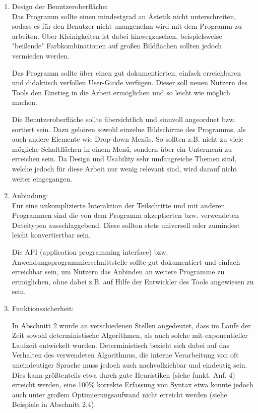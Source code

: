 \documentclass[12pt]{report}
\begin{document}
\begin{enumerate}
\item Design der Benutzeroberfläche:\\
Das Programm sollte einen mindestgrad an Ästetik nicht unterschreiten, sodass es für den Benutzer nicht unangenehm wird mit dem Programm zu arbeiten. Über Kleinigkeiten ist dabei hinwegzusehen, beispielsweise "beißende" Farbkombinationen auf großen Bildflächen sollten jedoch vermieden werden. 

Das Programm sollte über einen gut dokumentierten, einfach erreichbaren und didaktisch verfollen User-Guide verfügen. Dieser soll neuen Nutzern des Tools den Einstieg in die Arbeit ermöglichen und so leicht wie möglich machen.

Die Benutzeroberfläche sollte übersichtlich und sinnvoll angeordnet bzw. sortiert sein. Dazu gehören sowohl einzelne Bildschirme des Programms, als auch andere Elemente wie Drop-down Menüs. So sollten z.B. nicht zu viele mögliche Schaltflächen in einem Menü, sondern über ein Untermenü zu erreichen sein. Da Design und Usability sehr umfangreiche Themen sind, welche jedoch für diese Arbeit nur wenig relevant sind, wird darauf nicht weiter eingegangen. 

\item Anbindung:\\
Für eine unkomplizierte Interaktion der Teilschritte und mit anderen Programmen sind die von dem Programm akzeptierten bzw. verwendeten Dateitypen ausschlaggebend. Diese sollten stets universell oder zumindest leicht konvertiertbar sein. 

Die API (application programming interface) bzw. Anwendungsprogrammierschnittstelle sollte gut dokumentiert und einfach erreichbar sein, um Nutzern das Anbinden an weitere Programme zu ermöglichen, ohne dabei z.B. auf Hilfe der Entwickler des Tools angewiesen zu sein. 
 
\item Funktionssicherheit:

In Abschnitt 2 wurde an verschiedenen Stellen angedeutet, dass im Laufe der Zeit sowohl deterministische Algorithmen, als auch solche mit exponentieller Laufzeit entwickelt wurden. Deterministisch bezieht sich dabei auf das Verhalten des verwendeten Algorithmus, die interne Verarbeitung von oft uneindeutiger Sprache muss jedoch auch nachvollziehbar und eindeutig sein. Dies kann größtenteils etwa durch gute Heuristiken (siehe funkt. Anf. 4) erreicht werden, eine 100\% korrekte Erfassung von Syntax etwa konnte jedoch auch unter großem Optimierungsaufwand nicht erreicht werden (siehe Beispiele in Abschnitt 2.4). 


\end{enumerate}
\end{document}
